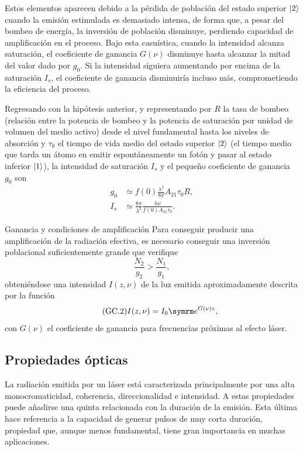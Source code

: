 Estos elementos aparecen debido a la pérdida de población del estado superior $\left|2\right\rangle$ cuando la emisión estimulada es demasiado intensa, de forma que, a pesar del bombeo de energía, la inversión de población disminuye, perdiendo capacidad de amplificación en el proceso. Bajo esta casuística, cuando la intensidad alcanza saturación, el coeficiente de ganancia $G(\nu)$ disminuye hasta alcanzar la mitad del valor dado por $g_{0}$. Si la intensidad siguiera aumentando por encima de la saturación $I_{s}$, el coeficiente de ganancia disminuiría incluso más, comprometiendo la eficiencia del proceso. 

Regresando con la hipótesis anterior, y representando por $R$ la tasa de bombeo (relación entre la potencia de bombeo y la potencia de saturación por unidad de volumen del medio activo) desde el nivel fundamental hasta los niveles de absorción y $\tau_{0}$ el tiempo de vida medio del estado superior $\left|2\right\rangle$ (el tiempo medio que tarda un átomo en emitir espontáneamente un fotón y pasar al estado inferior $\left|1\right\rangle$), la intensidad de saturación $I_{s}$ y el pequeño coeficiente de ganancia $g_{0}$ son
\begin{align}
    g_{0} &\simeq f(0)\frac{\lambda^{2}}{8 \pi}A_{21} \tau_{0}R, \\
    I_{s} &\simeq \frac{8 \pi}{\lambda^{2}}\frac{h \nu}{f(0)A_{21} \tau_{0}}.
\end{align}

\begin{footheorem*}{Ganancia y condiciones de amplificación}
    Para conseguir producir una amplificación de la radiación efectiva, es necesario conseguir una inversión poblacional suficientemente grande que verifique
    \begin{equation}
      \tag{GC.1}
      \frac{N_{2}}{g_{2}} > \frac{N_{1}}{g_{1}},
    \end{equation}
    obteniéndose una intensidad $I(z,\nu)$ de la luz emitida aproximadamente descrita por la función
    \begin{equation}
      \tag{GC.2}
      I(z,\nu) = I_{0}\eu^{G(\nu)z},
    \end{equation}
    con $G(\nu)$ el coeficiente de ganancia para frecuencias próximas al efecto láser.
\end{footheorem*}

\subsection{Propiedades ópticas}\label{sec:1.1.2}
La radiación emitida por un láser está caracterizada principalmente por una alta monocromaticidad, coherencia, direccionalidad e intensidad. A estas propiedades puede añadirse una quinta relacionada con la duración de la emisión\autocite{Svelto2010}. Esta última hace referencia a la capacidad de generar pulsos de muy corta duración, propiedad que, aunque menos fundamental, tiene gran importancia en muchas aplicaciones. 


